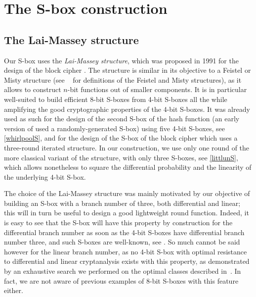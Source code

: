 \section{The \littlun S-box construction}
\label{sec:litt}


\subsection{The Lai-Massey structure}
Our S-box uses the \emph{Lai-Massey structure}, which was proposed in 1991 for the design
of the block cipher \idea \cite{idea}. The structure is similar in its objective to a Feistel or Misty structure
(see \eg{}~\cite{sac15} for definitions of the Feistel and Misty structures),
as it allows to construct $n$-bit functions out of smaller components. It is in particular well-suited
to build efficient 8-bit S-boxes from 4-bit S-boxes all the while amplifying the good cryptographic
properties of the 4-bit S-boxes.
It was already used as such for the design of the second S-box of the \whirlpool hash function
\cite{whirlpool} (an early version of \whirlpool used a randomly-generated S-box) using five
4-bit S-boxes, see \autoref{whirlpoolS},
and for the design of the S-box of the \fox block cipher \cite{fox} which uses a three-round iterated structure.
In our construction, we use only one round of the more classical variant of the structure, with only three S-boxes,
see \autoref{littlunS}, which allows nonetheless to square the differential probability
and the linearity of the underlying 4-bit S-box.

The choice of the Lai-Massey structure was mainly motivated by our objective of building
an S-box with a branch number of three, both differential and linear; this will in turn be useful to design a good lightweight round function.
Indeed, it is easy to see that the S-box will
have this property by construction for the differential branch number as soon as the 4-bit S-boxes have differential branch number three,
and such S-boxes are well-known, see \eg \serpent \cite{serpent}. So much cannot be said however for
the linear branch number, as no 4-bit S-box with optimal resistance to differential and linear cryptanalysis exists with this property, as
demonstrated by an exhaustive search we performed on the optimal classes described \eg{} in~\cite{class4bit}. In fact, we are not aware
of previous examples of 8-bit S-boxes with this feature either.

